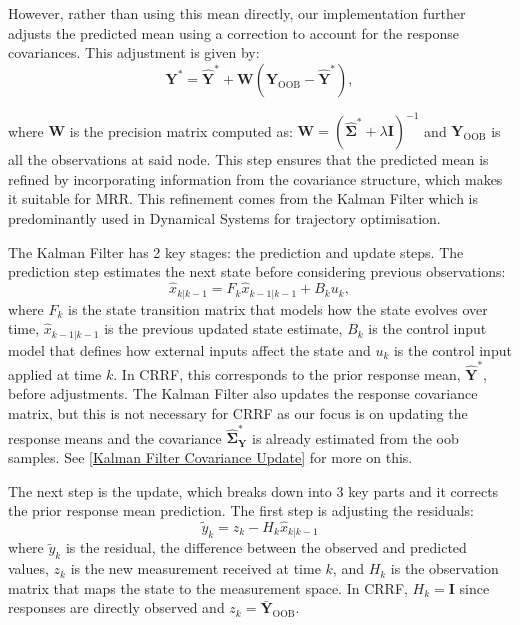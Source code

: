 However, rather than using this mean directly, our implementation further adjusts the predicted mean using a correction to account for the response covariances. This adjustment is given by:
\vspace{-0.1cm}
\begin{equation}
    \mathbf{Y}^* = \hat{\mathbf{Y}}^* + \mathbf{W} (\mathbf{{Y}}_{\text{OOB}} - \hat{\mathbf{Y}}^*),
    \label{adjust_mean}
\end{equation}

\noindent where \( \mathbf{W} \) is the precision matrix computed as:
$\mathbf{W} = (\hat{\mathbf{\Sigma}}^* + \lambda \mathbf{I})^{-1}$ and $\mathbf{{Y}}_{\text{OOB}}$ is all the observations at said node. This step ensures that the predicted mean is refined by incorporating information from the covariance structure, which makes it suitable for MRR. This refinement comes from the Kalman Filter which is predominantly used in Dynamical Systems for trajectory optimisation.\cite{ghysels2018applied} 

The Kalman Filter has 2 key stages: the prediction and update steps. The prediction step estimates the next state before considering previous observations:
\vspace{-0.2cm}
\begin{equation*}
    \hat{x}_{k|k-1} = F_k \hat{x}_{k-1|k-1} + B_k u_k,
\end{equation*}
where $F_k$ is the {state transition matrix} that models how the state evolves over time, $\hat{x}_{k-1|k-1}$ is the {previous updated state estimate}, $B_k$ is the {control input model} that defines how external inputs affect the state and $u_k$ is the {control input} applied at time $k$.\cite{faragher2012understanding} In CRRF, this corresponds to the prior response mean, $\mathbf{\hat{Y}}^*$, before adjustments.
The Kalman Filter also updates the response covariance matrix, but this is not necessary for CRRF as our focus is on updating the response means and the covariance $\hat{\mathbf{\Sigma}}_\mathbf{Y}^*$ is already estimated from the oob samples. See \ref{Kalman Filter Covariance Update} for more on this.

The next step is the update, which breaks down into 3 key parts and it corrects the prior response mean prediction. The first step is adjusting the residuals:
\vspace{-0.2cm}
\begin{equation*}
    \tilde{y}_k = z_k - H_k \hat{x}_{k|k-1}
\end{equation*}
where $\tilde{y}_k$ is the residual, the difference between the observed and predicted values, $z_k$ is the {new measurement} received at time $k$, and $H_k$ is the {observation matrix} that maps the state to the measurement space.\cite{faragher2012understanding} In CRRF, $H_k = \mathbf{I}$ since responses are directly observed and $z_k=\mathbf{\bar{Y}}_{\text{OOB}}$.

